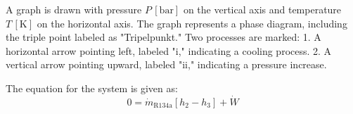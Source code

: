 A graph is drawn with pressure \( P \, [\text{bar}] \) on the vertical axis and temperature \( T \, [\text{K}] \) on the horizontal axis. The graph represents a phase diagram, including the triple point labeled as "Tripelpunkt." Two processes are marked:  
1. A horizontal arrow pointing left, labeled "i," indicating a cooling process.  
2. A vertical arrow pointing upward, labeled "ii," indicating a pressure increase.

The equation for the system is given as:  
\[
0 = \dot{m}_{\text{R134a}} \left[ h_2 - h_3 \right] + \dot{W}
\]